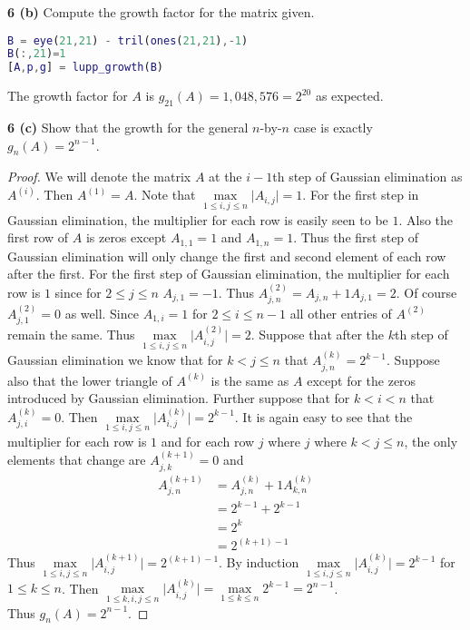 \documentclass[12pt]{article}
\newcommand{\problem}[1]{\hspace{-4 ex} \large \textbf{#1}}
\begin{document}
\problem{6 (b)} Compute the growth factor for the matrix given.
	
	\begin{lstlisting}[language=matlab]
B = eye(21,21) - tril(ones(21,21),-1)
B(:,21)=1
[A,p,g] = lupp_growth(B)
	\end{lstlisting}
	
	The growth factor for $A$ is $g_21(A)=1,048,576 = 2^{20}$ as expected.
	
\problem{6 (c)} Show that the growth for the general $n$-by-$n$ case is exactly $g_n(A)=2^{n-1}$.

	\begin{proof}
		We will denote the matrix $A$ at the $i-1$th step of Gaussian elimination as $A^{(i)}$. Then $A^{(1)} = A$. 
		Note that $\max\limits_{1\leq i,j\leq n}\lvert A_{i,j}\rvert = 1$. For the first step in Gaussian elimination, the multiplier for each row is easily seen to be $1$. Also the first row of $A$ is zeros except $A_{1,1}=1$ and $A_{1,n}=1$. Thus the first step of Gaussian elimination will only change the first and second element of each row after the first. For the first step of Gaussian elimination, the multiplier for each row is $1$ since for $ 2 \leq j \leq n$ $A_{j,1}=-1$. Thus $A^{(2)}_{j,n} = A_{j,n} + 1A_{j,1} = 2$. Of course $A^{(2)}_{j,1}=0$ as well. Since $A_{1,i}=1$ for $2 \leq i \leq n-1$ all other entries of $A^{(2)}$ remain the same. Thus $\max\limits_{1\leq i,j\leq n}\lvert A^{(2)}_{i,j}\rvert = 2$. Suppose that after the $k$th step of Gaussian elimination we know that for $k < j \leq n$ that $A^{(k)}_{j,n}= 2^{k-1}$. Suppose also that the lower triangle of $A^{(k)}$ is the same as $A$ except for the zeros introduced by Gaussian elimination. Further suppose that for $k < i < n$ that $A^{(k)}_{j,i}= 0$. Then $\max\limits_{1\leq i,j\leq n}\lvert A^{(k)}_{i,j}\rvert = 2^{k-1}$. It is again easy to see that the multiplier for each row is $1$ and for each row $j$ where $j$ where $k < j \leq n$, the only elements that change are $A^{(k+1)}_{j,k}= 0$ and 
		\begin{align*}
			A^{(k+1)}_{j,n} &= A^{(k)}_{j,n} + 1A^{(k)}_{k,n} \\
			& = 2^{k-1} + 2^{k-1} \\
			& = 2^{k} \\
			& = 2^{(k+1)-1}
		\end{align*}
		Thus $\max\limits_{1\leq i,j\leq n}\lvert A^{(k+1)}_{i,j}\rvert = 2^{(k+1)-1}$. By induction $\max\limits_{1\leq i,j\leq n}\lvert A^{(k)}_{i,j}\rvert = 2^{k-1}$ for $1 \leq k \leq n$. Then $\max\limits_{1\leq k,i,j\leq n}\lvert A^{(k)}_{i,j}\rvert = \max\limits_{1\leq k\leq n}2^{k-1} = 2^{n-1}$. \\
		Thus $g_n(A)=2^{n-1}$.		
	\end{proof}
\end{document}
